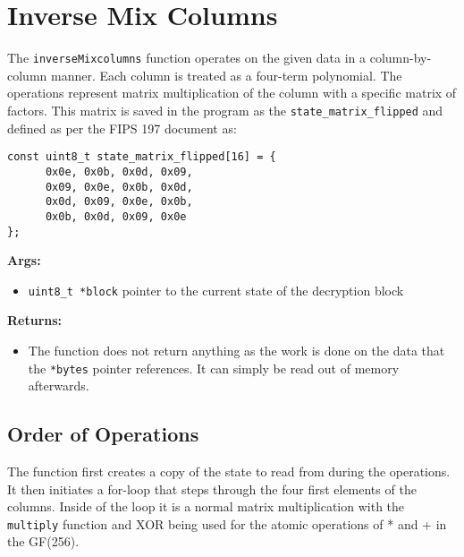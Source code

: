 \section{Inverse Mix Columns}
\label{ch:dec_inversemixcolumns}
The \lstinline{inverseMixcolumns} function operates on the given data in a column-by-column manner. Each column is treated as a four-term polynomial. The operations represent matrix multiplication of the column with a specific matrix of factors. This matrix is saved in the program as the \lstinline{state_matrix_flipped} and defined as per the FIPS 197 document as:
\begin{lstlisting}
const uint8_t state_matrix_flipped[16] = {
      0x0e, 0x0b, 0x0d, 0x09,
      0x09, 0x0e, 0x0b, 0x0d,
      0x0d, 0x09, 0x0e, 0x0b,
      0x0b, 0x0d, 0x09, 0x0e
};
\end{lstlisting}

\textbf{Args:}
\begin{itemize}
  \item \lstinline{uint8_t *block} pointer to the current state of the decryption block
\end{itemize}

\textbf{Returns:}
\begin{itemize}
  \item The function does not return anything as the work is done on the data that the \lstinline{*bytes} pointer references. It can simply be read out of memory afterwards.
\end{itemize}

\subsection{Order of Operations}
The function first creates a copy of the state to read from during the operations. It then initiates a for-loop that steps through the four first elements of the columns. Inside of the loop it is a normal matrix multiplication with the \lstinline{multiply} function and XOR being used for the atomic operations of * and + in the GF(256).
